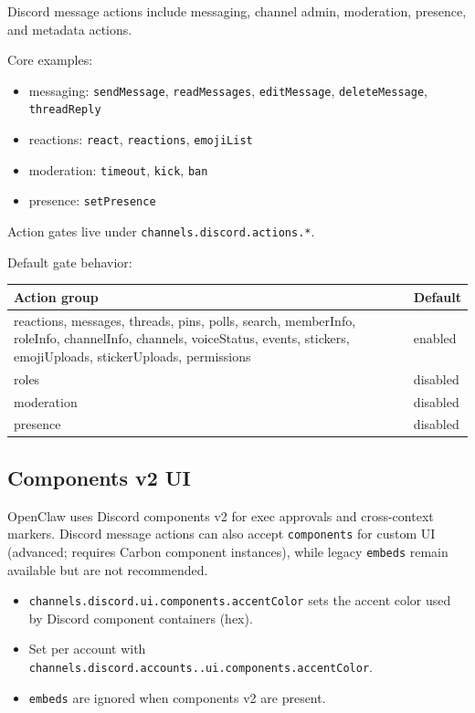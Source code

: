 Discord message actions include messaging, channel admin, moderation, presence, and metadata actions.

Core examples:

\begin{itemize}
  \item messaging: \texttt{sendMessage}, \texttt{readMessages}, \texttt{editMessage}, \texttt{deleteMessage}, \texttt{threadReply}
  \item reactions: \texttt{react}, \texttt{reactions}, \texttt{emojiList}
  \item moderation: \texttt{timeout}, \texttt{kick}, \texttt{ban}
  \item presence: \texttt{setPresence}
\end{itemize}


Action gates live under \texttt{channels.discord.actions.*}.

Default gate behavior:


\begin{table}[h]
\centering
\small
\begin{tabular}{|l|l|}
\hline
Action group & Default \\
\hline
reactions, messages, threads, pins, polls, search, memberInfo, roleInfo, channelInfo, channels, voiceStatus, events, stickers, emojiUploads, stickerUploads, permissions & enabled \\
\hline
roles & disabled \\
\hline
moderation & disabled \\
\hline
presence & disabled \\
\hline
\end{tabular}
\end{table}



\subsection{Components v2 UI}


OpenClaw uses Discord components v2 for exec approvals and cross-context markers. Discord message actions can also accept \texttt{components} for custom UI (advanced; requires Carbon component instances), while legacy \texttt{embeds} remain available but are not recommended.

\begin{itemize}
  \item \texttt{channels.discord.ui.components.accentColor} sets the accent color used by Discord component containers (hex).
  \item Set per account with \texttt{channels.discord.accounts..ui.components.accentColor}.
  \item \texttt{embeds} are ignored when components v2 are present.
\end{itemize}


